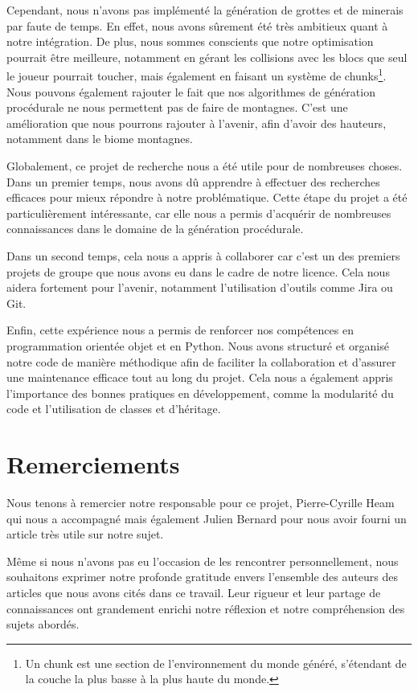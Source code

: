 \documentclass[12pt]{article}
\begin{document}
Cependant, nous n'avons pas implémenté la génération de grottes et de minerais par faute de temps. En effet, nous avons sûrement été très ambitieux quant à notre intégration. De plus, nous sommes conscients que notre optimisation pourrait être meilleure, notamment en gérant les collisions avec les blocs que seul le joueur pourrait toucher, mais également en faisant un système de chunks\footnote{Un chunk est une section de l’environnement du monde généré, s’étendant de la couche la plus basse à la plus haute du monde.}. Nous pouvons également rajouter le fait que nos algorithmes de génération procédurale ne nous permettent pas de faire de montagnes. C'est une amélioration que nous pourrons rajouter à l'avenir, afin d'avoir des hauteurs, notamment dans le biome montagnes.

Globalement, ce projet de recherche nous a été utile pour de nombreuses choses. Dans un premier temps, nous avons dû apprendre à effectuer des recherches efficaces pour mieux répondre à notre problématique. Cette étape du projet a été particulièrement intéressante, car elle nous a permis d’acquérir de nombreuses connaissances dans le domaine de la génération procédurale.\par
Dans un second temps, cela nous a appris à collaborer car c'est un des premiers projets de groupe que nous avons eu dans le cadre de notre licence. Cela nous aidera fortement pour l'avenir, notamment l'utilisation d'outils comme Jira ou Git.\par
Enfin, cette expérience nous a permis de renforcer nos compétences en programmation orientée objet et en Python. Nous avons structuré et organisé notre code de manière méthodique afin de faciliter la collaboration et d’assurer une maintenance efficace tout au long du projet. Cela nous a également appris l’importance des bonnes pratiques en développement, comme la modularité du code et l’utilisation de classes et d’héritage.
\newpage
{}
\section{Remerciements}
Nous tenons à remercier notre responsable pour ce projet, Pierre-Cyrille Heam qui nous a accompagné mais également Julien Bernard pour nous avoir fourni un article très utile sur notre sujet.\par
Même si nous n’avons pas eu l’occasion de les rencontrer personnellement, nous souhaitons exprimer notre profonde gratitude envers l’ensemble des auteurs des articles que nous avons cités dans ce travail. Leur rigueur et leur partage de connaissances ont grandement enrichi notre réflexion et notre compréhension des sujets abordés.
\end{document}

